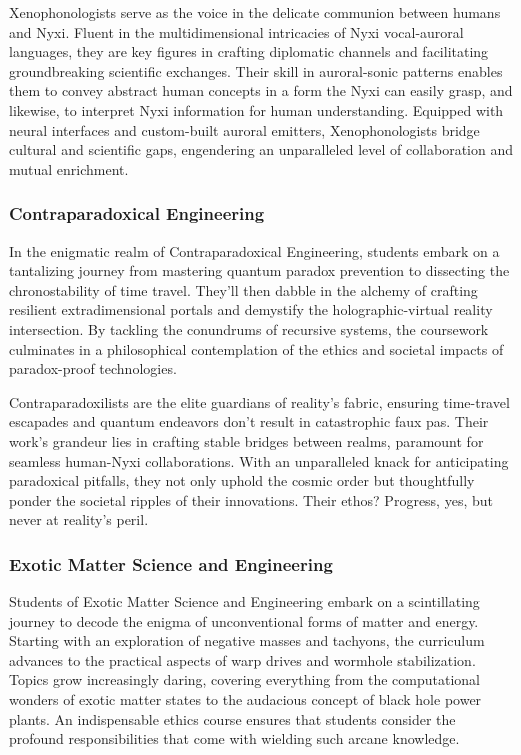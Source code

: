 Xenophonologists serve as the voice in the delicate communion between humans
and Nyxi. Fluent in the multidimensional intricacies of Nyxi vocal-auroral
languages, they are key figures in crafting diplomatic channels and
facilitating groundbreaking scientific exchanges. Their skill in auroral-sonic
patterns enables them to convey abstract human concepts in a form the Nyxi can
easily grasp, and likewise, to interpret Nyxi information for human
understanding. Equipped with neural interfaces and custom-built auroral
emitters, Xenophonologists bridge cultural and scientific gaps, engendering an
unparalleled level of collaboration and mutual enrichment.

\subsubsection{Contraparadoxical Engineering}
In the enigmatic realm of Contraparadoxical Engineering, students embark on a
tantalizing journey from mastering quantum paradox prevention to dissecting the
chronostability of time travel. They'll then dabble in the alchemy of crafting
resilient extradimensional portals and demystify the holographic-virtual
reality intersection. By tackling the conundrums of recursive systems, the
coursework culminates in a philosophical contemplation of the ethics and
societal impacts of paradox-proof technologies.

Contraparadoxilists are the elite guardians of reality's fabric, ensuring
time-travel escapades and quantum endeavors don't result in catastrophic faux
pas. Their work's grandeur lies in crafting stable bridges between realms,
paramount for seamless human-Nyxi collaborations. With an unparalleled knack
for anticipating paradoxical pitfalls, they not only uphold the cosmic order
but thoughtfully ponder the societal ripples of their innovations. Their ethos?
Progress, yes, but never at reality's peril.

\subsubsection{Exotic Matter Science and Engineering}
Students of Exotic Matter Science and Engineering embark on a scintillating
journey to decode the enigma of unconventional forms of matter and energy.
Starting with an exploration of negative masses and tachyons, the curriculum
advances to the practical aspects of warp drives and wormhole stabilization.
Topics grow increasingly daring, covering everything from the computational
wonders of exotic matter states to the audacious concept of black hole power
plants. An indispensable ethics course ensures that students consider the
profound responsibilities that come with wielding such arcane knowledge.

